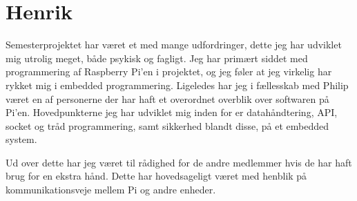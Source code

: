 \section{Henrik}

Semesterprojektet har været et med mange udfordringer, dette jeg har udviklet mig utrolig meget, både psykisk og fagligt.
Jeg har primært siddet med programmering af Raspberry Pi'en i projektet, og jeg føler at jeg virkelig har rykket mig i embedded programmering.
Ligeledes har jeg i fællesskab med Philip været en af personerne der har haft et overordnet overblik over softwaren på Pi'en.
Hovedpunkterne jeg har udviklet mig inden for er datahåndtering, API, socket og tråd programmering, samt sikkerhed blandt disse, på et embedded system.

Ud over dette har jeg været til rådighed for de andre medlemmer hvis de har haft brug for en ekstra hånd.
Dette har hovedsageligt været med henblik på kommunikationsveje mellem Pi og andre enheder.